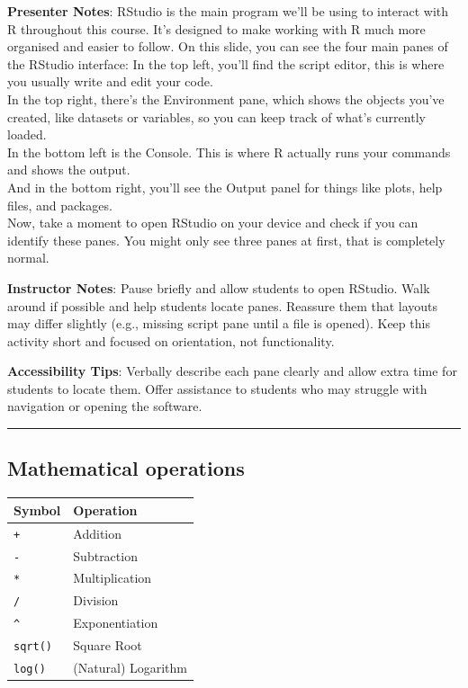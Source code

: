 \documentclass[
  letterpaper,
  DIV=11,
  numbers=noendperiod]{scrartcl}
\newcounter{none} %
\begin{document}
\textbf{Presenter Notes}: RStudio is the main program we'll be using to
interact with R throughout this course. It's designed to make working
with R much more organised and easier to follow. On this slide, you can
see the four main panes of the RStudio interface: In the top left,
you'll find the script editor, this is where you usually write and edit
your code.\\
In the top right, there's the Environment pane, which shows the objects
you've created, like datasets or variables, so you can keep track of
what's currently loaded.\\
In the bottom left is the Console. This is where R actually runs your
commands and shows the output.\\
And in the bottom right, you'll see the Output panel for things like
plots, help files, and packages.\\
Now, take a moment to open RStudio on your device and check if you can
identify these panes. You might only see three panes at first, that is
completely normal.

\textbf{Instructor Notes}: Pause briefly and allow students to open
RStudio. Walk around if possible and help students locate panes.
Reassure them that layouts may differ slightly (e.g., missing script
pane until a file is opened). Keep this activity short and focused on
orientation, not functionality.

\textbf{Accessibility Tips}: Verbally describe each pane clearly and
allow extra time for students to locate them. Offer assistance to
students who may struggle with navigation or opening the software.

\begin{center}\rule{0.5\linewidth}{0.5pt}\end{center}

\subsection{Mathematical operations}\label{mathematical-operations}

{\def\LTcaptype{none} %
\begin{longtable}[]{@{}ll@{}}
\toprule\noalign{}
Symbol & Operation \\
\midrule\noalign{}
\endhead
\bottomrule\noalign{}
\endlastfoot
\texttt{+} & Addition \\
\texttt{-} & Subtraction \\
\texttt{*} & Multiplication \\
\texttt{/} & Division \\
\texttt{\^{}} & Exponentiation \\
\texttt{sqrt()} & Square Root \\
\texttt{log()} & (Natural) Logarithm \\
\end{longtable}
}
\end{document}
